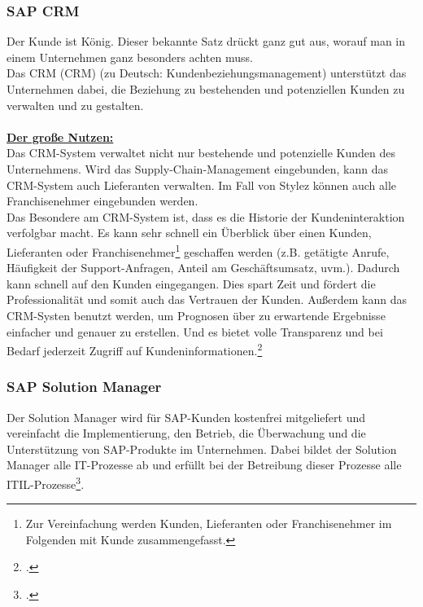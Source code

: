 \subsubsection{SAP CRM}
\glqq Der Kunde ist König\grqq. Dieser bekannte Satz drückt ganz gut aus, worauf man in einem Unternehmen ganz besonders achten muss.\\
Das \acrlong{CRM} (CRM) (zu Deutsch: Kundenbeziehungsmanagement) unterstützt das Unternehmen dabei, die Beziehung zu bestehenden und potenziellen Kunden zu verwalten und zu gestalten.\\
\\
\underline{\textbf{Der große Nutzen:}}\\
Das CRM-System verwaltet nicht nur bestehende und potenzielle Kunden des Unternehmens. Wird das Supply-Chain-Management eingebunden, kann das CRM-System auch Lieferanten verwalten. Im Fall von Stylez können auch alle Franchisenehmer eingebunden werden.\\
Das Besondere am CRM-System ist, dass es die Historie der Kundeninteraktion verfolgbar macht. Es kann sehr schnell ein Überblick über einen Kunden, Lieferanten oder Franchisenehmer\footnote{Zur Vereinfachung werden Kunden, Lieferanten oder Franchisenehmer im Folgenden mit Kunde zusammengefasst.} geschaffen werden (z.B. getätigte Anrufe, Häufigkeit der Support-Anfragen, Anteil am Geschäftsumsatz, uvm.).
Dadurch kann schnell auf den Kunden eingegangen. Dies spart Zeit und fördert die Professionalität und somit auch das Vertrauen der Kunden. Außerdem kann das CRM-Systen benutzt werden, um Prognosen über zu erwartende Ergebnisse einfacher und genauer zu erstellen. Und es bietet volle Transparenz und bei Bedarf jederzeit Zugriff auf Kundeninformationen.\footcite[vgl.][Online im Internet.]{CRM}

\subsubsection{SAP Solution Manager}
Der Solution Manager wird für SAP-Kunden kostenfrei mitgeliefert und vereinfacht die Implementierung, den Betrieb, die Überwachung und die Unterstützung von SAP-Produkte im Unternehmen. Dabei bildet der Solution Manager alle IT-Prozesse ab und erfüllt bei der Betreibung dieser Prozesse alle ITIL-Prozesse\footcite[vgl.][Online im Internet.]{SAPITIL}.

